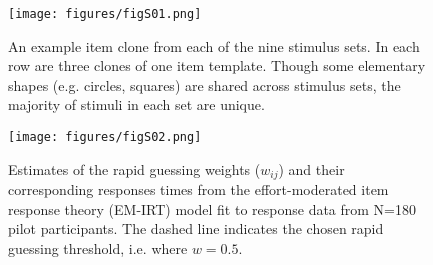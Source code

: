 \documentclass[a4paper,man,natbib]{apa6}
\begin{document}
\begin{figure}
\centering
\texttt{[image: figures/figS01.png]}
\caption{\label{fig:figS01} An example item clone from each of the nine stimulus sets. In each row are three clones of one item template. Though some elementary shapes (e.g. circles, squares) are shared across stimulus sets, the majority of stimuli in each set are unique.}
\end{figure}

\begin{figure}
\centering
\texttt{[image: figures/figS02.png]}
\caption{\label{fig:figS02} Estimates of the rapid guessing weights ($w_{ij}$) and their corresponding responses times from the effort-moderated item response theory (EM-IRT) model fit to response data from N=180 pilot participants. The dashed line indicates the chosen rapid guessing threshold, i.e. where $w = 0.5$.}
\end{figure}
\end{document}
